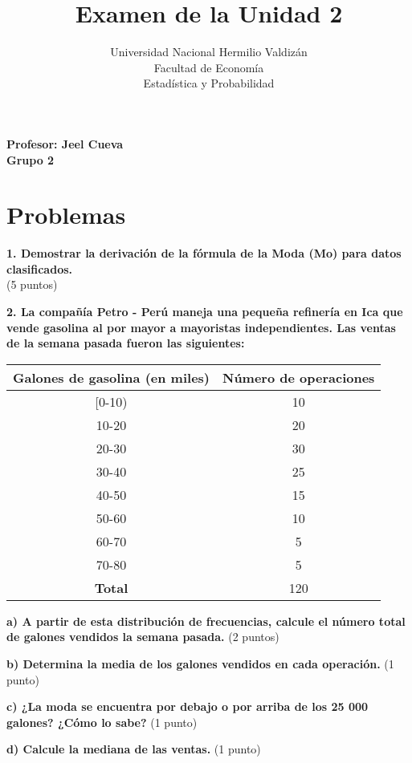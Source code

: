 \documentclass[12pt]{article}
\title{Examen de la Unidad 2}
\author{Universidad Nacional Hermilio Valdizán \\ Facultad de Economía \\ Estadística y Probabilidad}
\date{}
\begin{document}
\maketitle

\begin{center}
\textbf{Profesor: Jeel Cueva} \\ 
\textbf{Grupo 2}
\end{center}

\section*{Problemas}

\textbf{1. Demostrar la derivación de la fórmula de la Moda (Mo) para datos clasificados.} \\
(5 puntos)

\vspace{1cm}

\textbf{2. La compañía Petro - Perú maneja una pequeña refinería en Ica que vende gasolina al por mayor a mayoristas independientes. Las ventas de la semana pasada fueron las siguientes:}

\begin{center}
\begin{tabular}{|c|c|}
\hline
\textbf{Galones de gasolina (en miles)} & \textbf{Número de operaciones} \\
\hline
[0-10) & 10 \\
10-20 & 20 \\
20-30 & 30 \\
30-40 & 25 \\
40-50 & 15 \\
50-60 & 10 \\
60-70 & 5 \\
70-80 & 5 \\
\hline
\textbf{Total} & 120 \\
\hline
\end{tabular}
\end{center}

\textbf{a) A partir de esta distribución de frecuencias, calcule el número total de galones vendidos la semana pasada.} (2 puntos)

\textbf{b) Determina la media de los galones vendidos en cada operación.} (1 punto)

\textbf{c) ¿La moda se encuentra por debajo o por arriba de los 25 000 galones? ¿Cómo lo sabe?} (1 punto)

\textbf{d) Calcule la mediana de las ventas.} (1 punto)
\end{document}
